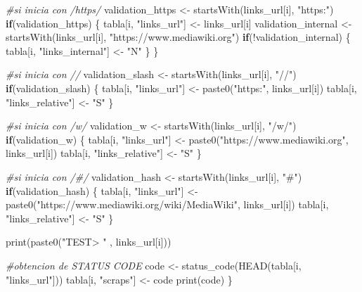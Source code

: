 \documentclass[
]{article}
\newenvironment{Shaded}{\begin{snugshade}}{\end{snugshade}}
\newcommand{\CommentTok}[1]{\textcolor[rgb]{0.56,0.35,0.01}{\textit{#1}}}
\newcommand{\ControlFlowTok}[1]{\textcolor[rgb]{0.13,0.29,0.53}{\textbf{#1}}}
\newcommand{\FunctionTok}[1]{\textcolor[rgb]{0.00,0.00,0.00}{#1}}
\newcommand{\NormalTok}[1]{#1}
\newcommand{\OtherTok}[1]{\textcolor[rgb]{0.56,0.35,0.01}{#1}}
\newcommand{\SpecialCharTok}[1]{\textcolor[rgb]{0.00,0.00,0.00}{#1}}
\newcommand{\StringTok}[1]{\textcolor[rgb]{0.31,0.60,0.02}{#1}}
\begin{document}
\begin{Shaded}
\begin{Highlighting}[]
  \CommentTok{\#si inicia con /https/}
\NormalTok{  validation\_https }\OtherTok{\textless{}{-}} \FunctionTok{startsWith}\NormalTok{(links\_url[i], }\StringTok{"https:"}\NormalTok{)}
  \ControlFlowTok{if}\NormalTok{(validation\_https) \{}
\NormalTok{    tabla[i, }\StringTok{"links\_url"}\NormalTok{] }\OtherTok{\textless{}{-}}\NormalTok{ links\_url[i]}
\NormalTok{    validation\_internal }\OtherTok{\textless{}{-}} \FunctionTok{startsWith}\NormalTok{(links\_url[i], }\StringTok{"https://www.mediawiki.org"}\NormalTok{)}
    \ControlFlowTok{if}\NormalTok{(}\SpecialCharTok{!}\NormalTok{validation\_internal) \{}
\NormalTok{      tabla[i, }\StringTok{"links\_internal"}\NormalTok{] }\OtherTok{\textless{}{-}} \StringTok{"N"}
\NormalTok{    \}}
\NormalTok{  \}}
  
  \CommentTok{\#si inicia con //}
\NormalTok{  validation\_slash }\OtherTok{\textless{}{-}} \FunctionTok{startsWith}\NormalTok{(links\_url[i], }\StringTok{"//"}\NormalTok{)}
  \ControlFlowTok{if}\NormalTok{(validation\_slash) \{}
\NormalTok{    tabla[i, }\StringTok{"links\_url"}\NormalTok{] }\OtherTok{\textless{}{-}} \FunctionTok{paste0}\NormalTok{(}\StringTok{"https:"}\NormalTok{, links\_url[i])}
\NormalTok{    tabla[i, }\StringTok{"links\_relative"}\NormalTok{] }\OtherTok{\textless{}{-}} \StringTok{"S"}
\NormalTok{  \}}
  
  \CommentTok{\#si inicia con /w/}
\NormalTok{  validation\_w }\OtherTok{\textless{}{-}} \FunctionTok{startsWith}\NormalTok{(links\_url[i], }\StringTok{"/w/"}\NormalTok{)}
  \ControlFlowTok{if}\NormalTok{(validation\_w) \{}
\NormalTok{    tabla[i, }\StringTok{"links\_url"}\NormalTok{] }\OtherTok{\textless{}{-}} \FunctionTok{paste0}\NormalTok{(}\StringTok{"https://www.mediawiki.org"}\NormalTok{, links\_url[i])}
\NormalTok{    tabla[i, }\StringTok{"links\_relative"}\NormalTok{] }\OtherTok{\textless{}{-}} \StringTok{"S"}
\NormalTok{  \}}
  
  \CommentTok{\#si inicia con /\#/}
\NormalTok{  validation\_hash }\OtherTok{\textless{}{-}} \FunctionTok{startsWith}\NormalTok{(links\_url[i], }\StringTok{"\#"}\NormalTok{)}
  \ControlFlowTok{if}\NormalTok{(validation\_hash) \{}
\NormalTok{    tabla[i, }\StringTok{"links\_url"}\NormalTok{] }\OtherTok{\textless{}{-}} \FunctionTok{paste0}\NormalTok{(}\StringTok{"https://www.mediawiki.org/wiki/MediaWiki"}\NormalTok{, links\_url[i])}
\NormalTok{    tabla[i, }\StringTok{"links\_relative"}\NormalTok{] }\OtherTok{\textless{}{-}} \StringTok{"S"}
\NormalTok{  \}}
  
  \FunctionTok{print}\NormalTok{(}\FunctionTok{paste0}\NormalTok{(}\StringTok{"TEST\textgreater{} "}\NormalTok{ , links\_url[i]))}
  
  \CommentTok{\#obtencion de STATUS CODE}
\NormalTok{  code }\OtherTok{\textless{}{-}} \FunctionTok{status\_code}\NormalTok{(}\FunctionTok{HEAD}\NormalTok{(tabla[i, }\StringTok{"links\_url"}\NormalTok{]))}
\NormalTok{  tabla[i, }\StringTok{"scraps"}\NormalTok{] }\OtherTok{\textless{}{-}}\NormalTok{ code}
  \FunctionTok{print}\NormalTok{(code)}
\NormalTok{\}}
\end{Highlighting}
\end{Shaded}
\end{document}
